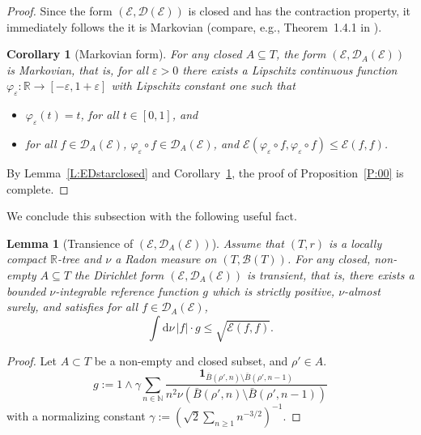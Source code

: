 \documentclass[11pt]{amsart}
\numberwithin{equation}{section}
\newtheorem{cor}[definition]{Corollary}
\newtheorem{lemma}[definition]{Lemma}
\begin{document}
{\begin{proof}
{Since the form $({\mathcal E},{\mathcal D}({\mathcal E}))$ is closed and has the contraction property, it immediately follows the it is Markovian
(compare, e.g., {Theorem~1.4.1 in \cite{FukushimaOshimaTakeda1994}}).
\begin{cor}[Markovian form]
For any closed {$A\subseteq T$},
the form
$({\mathcal E},{\mathcal D}_A({\mathcal E}))$
is Markovian, that is, for all $\varepsilon>0$
there exists a Lipschitz continuous function
\label{L:EDstarmarkovian}
$\varphi_\varepsilon:{{\mathbb R}}\to[-\varepsilon,1+\varepsilon]$ with Lipschitz
constant one such that
\begin{itemize}
\item[(i)]
$\varphi_\varepsilon(t)=t$, for all $t\in[0,1]$, and
\item[(ii)] for all $f\in\mathcal D_A(\mathcal E)$,
$\varphi_\varepsilon\circ f\in\mathcal D_A(\mathcal E)$, and
$\mathcal E(\varphi_\varepsilon\circ f,\varphi_\varepsilon\circ f)
\leq
\mathcal E(f,f)$.
\end{itemize}
\end{cor}{\smallskip}}

By Lemma~\ref{L:EDstarclosed} and  Corollary~\ref{L:EDstarmarkovian}, the proof of Proposition~\ref{P:00} is complete.
\end{proof}{\smallskip}

We conclude this subsection with the following useful fact.
\begin{lemma}[Transience of $({\mathcal E},{\mathcal D}_A({\mathcal E}))$] \label{L:dtrans} Assume that $(T,r)$ is a locally compact ${{\mathbb R}}$-tree and $\nu$ a Radon measure on
$(T,{\mathcal B}(T))$.
For any closed, non-empty {$A\subseteq T$} the Dirichlet form
$(\mathcal E,\mathcal D_A(\mathcal E))$ is transient, \label{L:01}
that is, there exists a bounded $\nu$-integrable reference function $g$ which is strictly positive,
$\nu$-almost surely, and satisfies
for all $f\in{\mathcal D}_A({\mathcal E})$,
\begin{equation}\label{e:trans}
   \int\mathrm{d}\nu\,|f|\cdot g
 \le
   \sqrt{{\mathcal E}(f,f)}.
\end{equation}
\end{lemma}{\smallskip}

\begin{proof} Let $A\subset T$ be a non-empty and closed subset, and $\rho'\in A$.
\begin{equation}
   g  :=
   {1\wedge} \gamma\sum_{n\in{{\mathbb N}}}\frac{\mathbf{1}_{\bar{B}(\rho',n)\setminus\bar{B}(\rho',n-1)}}{n^2\nu(\bar{B}(\rho',n)\setminus\bar{B}(\rho',n-1))}
\end{equation}
with a normalizing constant $\gamma:=(\sqrt{2}\sum_{n\ge 1}n^{-3/2})^{-1}$.


\end{proof}}
\end{document}
